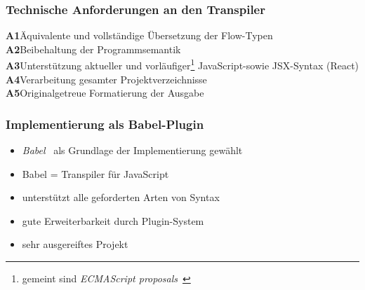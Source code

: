     \begin{frame}
      \frametitle{Technische Anforderungen an den Transpiler}
      \textbf{A1}\hspace{0.75em}Äquivalente und vollständige Übersetzung der Flow-Typen\\[.6em]
      \textbf{A2}\hspace{0.75em}Beibehaltung der Programmsemantik\\[.6em]
      \textbf{A3}\hspace{0.75em}Unterstützung aktueller und vorläufiger\footnote{gemeint sind \textit{ECMAScript proposals}~\autocite{ES_PROPOSALS}} JavaScript-\secframebr sowie JSX-Syntax (React)\\[.6em]
      \textbf{A4}\hspace{0.75em}Verarbeitung gesamter Projektverzeichnisse\\[.6em]
      \textbf{A5}\hspace{0.75em}Originalgetreue Formatierung der Ausgabe
    \end{frame}


    \begin{frame}
      \frametitle{Implementierung als Babel-Plugin}
      \begin{itemize}
        \item \textit{Babel}~\autocite{BABEL} als Grundlage der Implementierung gewählt
        \item Babel = Transpiler für JavaScript
        \item unterstützt alle geforderten Arten von Syntax
        \item gute Erweiterbarkeit durch Plugin-System
        \item sehr ausgereiftes Projekt
      \end{itemize}
    \end{frame}

